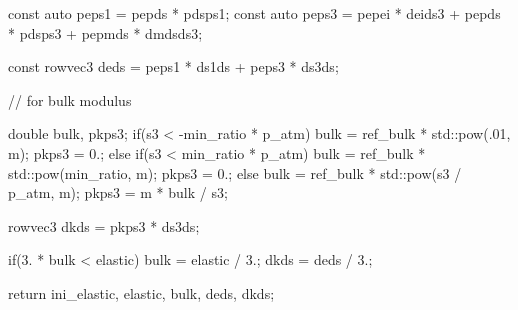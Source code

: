 \begin{cppcode}
{    const auto peps1 = pepds * pdsps1;
    const auto peps3 = pepei * deids3 + pepds * pdsps3 + pepmds * dmdsds3;

    const rowvec3 deds = peps1 * ds1ds + peps3 * ds3ds;

    // for bulk modulus

    double bulk, pkps3;
    if(s3 < -min_ratio * p_atm) {
        bulk = ref_bulk * std::pow(.01, m);
        pkps3 = 0.;
    }
    else if(s3 < min_ratio * p_atm) {
        bulk = ref_bulk * std::pow(min_ratio, m);
        pkps3 = 0.;
    }
    else {
        bulk = ref_bulk * std::pow(s3 / p_atm, m);
        pkps3 = m * bulk / s3;
    }

    rowvec3 dkds = pkps3 * ds3ds;

    if(3. * bulk < elastic) {
        bulk = elastic / 3.;
        dkds = deds / 3.;
    }

    return {ini_elastic, elastic, bulk, deds, dkds};
}
\end{cppcode}
